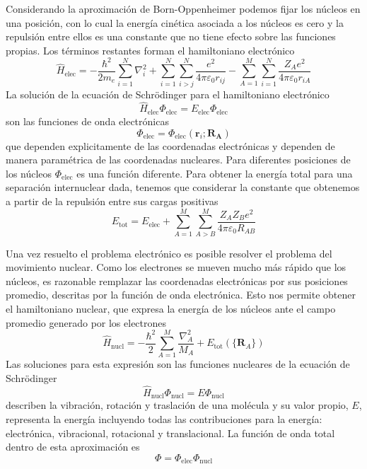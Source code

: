 \documentclass{tufte-handout}
\begin{document}
Considerando la aproximación de Born-Oppenheimer podemos fijar
los núcleos en una posición, con lo cual la energía cinética 
asociada a los núcleos es cero y la repulsión entre ellos es
una constante que no tiene efecto sobre las funciones propias. 
Los términos restantes forman el hamiltoniano electrónico
\begin{equation}
    \hat{H}_\mathrm{elec}= -\frac{\hbar^2}{2m_e}\sum_{i=1}^N\nabla^2_i 
    +\sum_{i=1}^N\sum_{i>j}^N \frac{e^2}{4\pi\varepsilon_0r_{ij}}
    -\sum_{A=1}^M\sum_{i=1}^{N}\frac{Z_Ae^2}{4\pi\varepsilon_0r_{iA}} 
\end{equation}
La solución de la ecuación de Schrödinger para el hamiltoniano
electrónico 
\begin{equation}
\hat{H}_\mathrm{elec}\Phi_\mathrm{elec} = E_\mathrm{elec}\Phi_\mathrm{elec}
\end{equation}
son las funciones de onda electrónicas
\begin{equation}
    \Phi_\mathrm{elec}=\Phi_\mathrm{elec}({\mathbf{r}_i}; {\mathbf{R_A}})
\end{equation}
que dependen explicitamente de las coordenadas electrónicas y
dependen de manera paramétrica de las coordenadas nucleares.
Para diferentes posiciones de los núcleos $\Phi_\mathrm{elec}$
es una función diferente. Para obtener la energía total para
una separación internuclear dada, tenemos que considerar
la constante que obtenemos a partir de la repulsión entre sus
cargas positivas
\begin{equation}
    E_\mathrm{tot}= E_\mathrm{elec} + \sum_{A=1}^M\sum_{A>B}^M\frac{Z_AZ_Be^2}{4\pi\varepsilon_0R_{AB}}
\end{equation}

Una vez resuelto el problema electrónico es posible resolver 
el problema del movimiento nuclear. Como los electrones se 
mueven mucho más rápido que los núcleos, es razonable
remplazar las coordenadas electrónicas por sus posiciones 
promedio, descritas por la función de onda electrónica. Esto
nos permite obtener el hamiltoniano nuclear, que expresa la 
energía de los núcleos ante el campo promedio generado por los
electrones
\begin{equation}
    \hat{H}_\mathrm{nucl}=-\frac{\hbar^2}{2}\sum_{A=1}^M\frac{\nabla^2_A}{M_A} + E_\mathrm{tot}(\{ \mathbf{R}_A\})
\end{equation}
Las soluciones
para esta expresión son las funciones nucleares de
la ecuación de Schrödinger
\begin{equation}
    \hat{H}_\mathrm{nucl}\Phi_\mathrm{nucl} = E\Phi_\mathrm{nucl}
\end{equation}
describen la vibración, rotación y traslación
de una molécula y su valor propio, $E$,
representa la energía incluyendo todas  
las contribuciones para la energía: 
electrónica, vibracional, rotacional y
translacional. La función de onda total
dentro de esta aproximación es
\begin{equation}
    \Phi=\Phi_\mathrm{elec}\Phi_\mathrm{nucl}
\end{equation}
\end{document}

